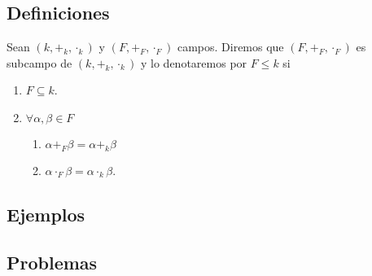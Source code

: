 \subsection*{Definiciones}
Sean \( (k, +_k, \cdot_k) \) y \( (F, +_F, \cdot_F) \) campos.
Diremos que \( (F, +_F, \cdot_F) \) es subcampo de \( (k, +_k, \cdot_k) \) y lo denotaremos por \( F \leq k \) si
\begin{enumerate}
    \item \( F \subseteq k \).
    \item \( \forall \alpha, \beta \in F \)
    \begin{enumerate}
        \item \( \alpha +_F \beta = \alpha +_k \beta \)
        \item \( \alpha \cdot_F \beta = \alpha \cdot_k \beta \).
    \end{enumerate}
\end{enumerate}

\subsection*{Ejemplos}

\subsection*{Problemas}